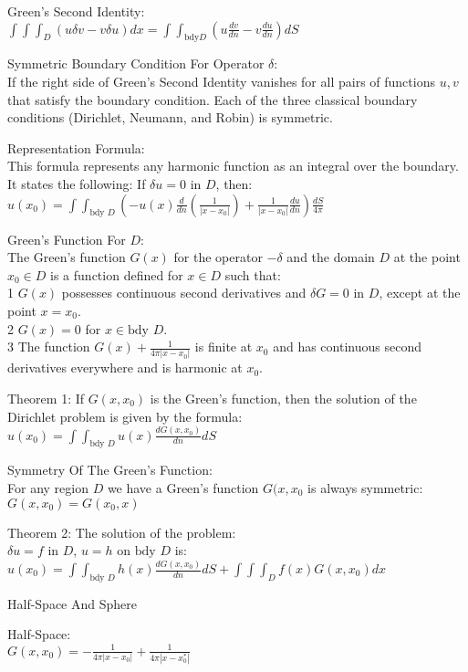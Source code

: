 Green's Second Identity: \\
$\int \int \int_D (u \delta v - v \delta u) dx = \int \int_{\text{bdy} D} \left(u \frac{dv}{dn} - v \frac{du}{dn} \right) dS$

Symmetric Boundary Condition For Operator $\delta$: \\
If the right side of Green's Second Identity vanishes for all pairs of functions $u,v$ that satisfy the boundary condition. Each of the three classical boundary conditions (Dirichlet, Neumann, and Robin) is symmetric.

Representation Formula: \\
This formula represents any harmonic function as an integral over the boundary. It states the following: If $\delta u = 0$ in $D$, then: \\
$u(x_0) = \int \int_{\text{bdy }D} \left(-u(x) \frac{d}{dn} \left(\frac{1}{|x-x_0|} \right) + \frac{1}{|x-x_0|} \frac{du}{dn} \right) \frac{dS}{4 \pi}$

Green's Function For $D$: \\
The Green's function $G(x)$ for the operator $- \delta$ and the domain $D$ at the point $x_0 \in D$ is a function defined for $x \in D$ such that: \\
1 $G(x)$ possesses continuous second derivatives and $\delta G = 0$ in $D$, except at the point $x=x_0$. \\
2 $G(x)=0$ for $x \in \text{bdy }D$. \\
3 The function $G(x)+\frac{1}{4 \pi |x-x_0|}$ is finite at $x_0$ and has continuous second derivatives everywhere and is harmonic at $x_0$.

Theorem 1: If $G(x,x_0)$ is the Green's function, then the solution of the Dirichlet problem is given by the formula: \\
$u(x_0)=\int \int_{\text{bdy }D} u(x) \frac{d G(x,x_0)}{dn} dS$

Symmetry Of The Green's Function: \\
For any region $D$ we have a Green's function $G(x,x_0$ is always symmetric: $G(x,x_0)=G(x_0,x)$

Theorem 2: The solution of the problem: \\
$\delta u=f$ in $D$, $u=h$ on $\text{bdy }D$ is: \\
$u(x_0)=\int \int_{\text{bdy }D} h(x) \frac{d G(x,x_0)}{dn} dS + \int \int \int_D f(x) G(x,x_0) dx$

Half-Space And Sphere

Half-Space: \\
$G(x,x_0)=-\frac{1}{4 \pi |x-x_0|}+\frac{1}{4 \pi |x-x_0^{*}|}$

